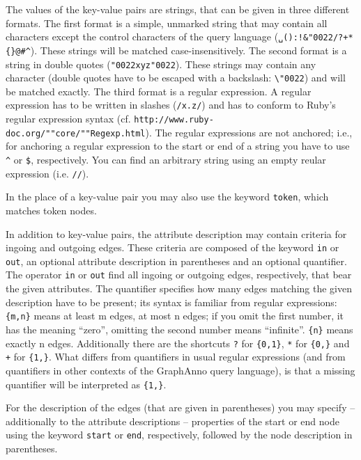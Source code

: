 \documentclass[12pt]{scrartcl}
\newcommand{\quo}{\char"0022}
\begin{document}
\label{zeichenketten}The values of the key-value pairs are strings, that can be given in three different formats.
The first format is a simple, unmarked string that may contain all characters except the control characters of the query language (\texttt{␣():!\&\quo/?+*\{\}@\#\^{}}).
These strings will be matched case-insensitively.
The second format is a string in double quotes (\texttt{{\quo}xyz\quo}).
These strings may contain any character (double quotes have to be escaped with a backslash: \texttt{\textbackslash\quo}) and will be matched exactly.
The third format is a regular expression.
A regular expression has to be written in slashes (\texttt{/x.z/}) and has to conform to Ruby’s regular expression syntax (cf. \texttt{http://www.ruby-doc.org/""core/""Regexp.html}).
The regular expressions are not anchored; i.e., for anchoring a regular expression to the start or end of a string you have to use \texttt{\^} or \texttt{\$}, respectively.
You can find an arbitrary string using an empty reular expression (i.e. \texttt{//}).

In the place of a key-value pair you may also use the keyword \texttt{token}, which matches token nodes.

\label{quantifiers}In addition to key-value pairs, the attribute description may contain criteria for ingoing and outgoing edges.
These criteria are composed of the keyword \texttt{in} or \texttt{out}, an optional attribute description in parentheses and an optional quantifier.
The operator \texttt{in} or \texttt{out} find all ingoing or outgoing edges, respectively, that bear the given attributes.
The quantifier specifies how many edges matching the given description have to be present; its syntax is familiar from regular expressions:
\texttt{\{m,n\}} means at least m edges, at most n edges; if you omit the first number, it has the meaning “zero”, omitting the second number means “infinite”.
\texttt{\{n\}} means exactly n edges.
Additionally there are the shortcuts \texttt{?} for \texttt{\{0,1\}}, \texttt{*} for \texttt{\{0,\}} and \texttt{+} for \texttt{\{1,\}}.
What differs from quantifiers in usual regular expressions (and from quantifiers in other contexts of the GraphAnno query language), is that a missing quantifier will be interpreted as \texttt{\{1,\}}.

For the description of the edges (that are given in parentheses) you may specify – additionally to the attribute descriptions – properties of the start or end node using the keyword \texttt{start} or \texttt{end}, respectively, followed by the node description in parentheses.
\end{document}

